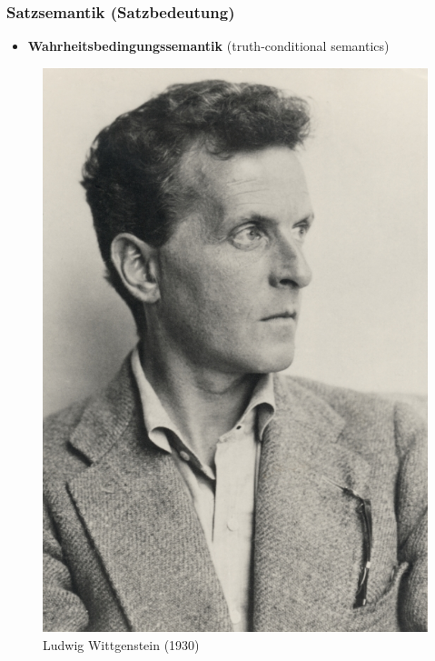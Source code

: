 \begin{frame}
\frametitle{Satzsemantik (Satzbedeutung)}

\begin{itemize}
	\item \textbf{Wahrheitsbedingungssemantik} (truth-conditional semantics)
	
\end{itemize}

\begin{minipage}{.3\textwidth}
	
	\begin{figure}
		\begin{center}
			\includegraphics[scale=1.2]{material/Ludwig_Wittgenstein}
		\end{center}	
		\caption{Ludwig Wittgenstein (1930)}
	\end{figure}
	

\end{minipage}
\end{frame}
